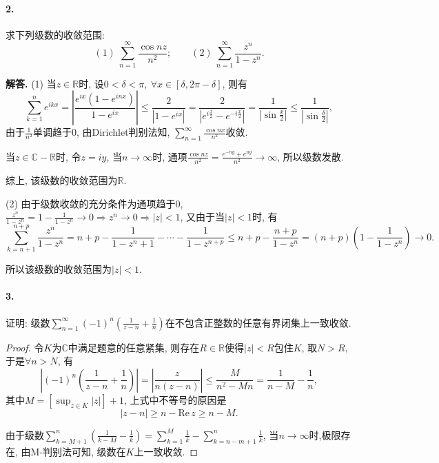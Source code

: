 \documentclass[12pt, a4paper, oneside]{ctexart}
\newenvironment{solution}{\par\noindent\textbf{解答. }}{\bigskip\par}
\let\geq=\geqslant %
\def\R{\mathbb{R}}      %
\def\C{\mathbb{C}}      %
\def\re{\mathrm{Re}\,}    %
\def\add{\vspace{1ex}}  %
\begin{document}
\paragraph{2.}求下列级数的收敛范围:
\begin{equation*}
    (1)\ \sum_{n=1}^\infty\frac{\cos nz}{n^2};\qquad(2)\ \sum_{n=1}^\infty\frac{z^n}{1-z^n}.
\end{equation*}
\begin{solution}
    (1) 当$z\in \mathbb{R}$时, 设$0 < \delta < \pi,\ \forall x \in [\delta, 2\pi - \delta]$, 则有
    \begin{equation*}
        \sum_{k=1}^ne^{ikx} = \left|\frac{e^{ix}(1-e^{inx})}{1-e^{ix}}\right| \leqslant \frac{2}{|1-e^{ix}|} = \frac{2}{|e^{i\frac{x}{2}}-e^{-i\frac{x}{2}}|} = \frac{1}{|\sin\frac{x}{2}|}\leqslant \frac{1}{|\sin\frac{\delta}{2}|},
    \end{equation*}
    由于$\frac{1}{n^2}$单调趋于$0$, 由Dirichlet判别法知, $ \sum_{n=1}^\infty\frac{\cos nx}{n^2}$收敛.

    当$z\in \C-\R$时, 令$z = iy$, 当$n\rightarrow \infty$时, 通项$ \frac{\cos nz}{n^2}=\frac{e^{-ny}+e^{ny}}{n^2}\rightarrow \infty$, 所以级数发散.

    综上, 该级数的收敛范围为$\R$.

    (2) 由于级数收敛的充分条件为通项趋于$0$, $ \frac{z^n}{1-z^n} = 1-\frac{1}{1-z^n} \rightarrow 0\Rightarrow z^n\rightarrow 0\Rightarrow |z| < 1$, 又由于当$|z|<1$时, 有
    \begin{equation*}
        \sum_{k=n+1}^{n+p}\frac{z^n}{1-z^n} = n+p-\frac{1}{1-z^n+1}-\cdots-\frac{1}{1-z^{n+p}}\leqslant n+p-\frac{n+p}{1-z^n} = (n+p)(1-\frac{1}{1-z^n})\rightarrow 0.
    \end{equation*}

    所以该级数的收敛范围为$|z|<1$.
\end{solution}
\paragraph{3.}证明: 级数$ \sum_{n=1}^\infty(-1)^n\left(\frac{1}{z-n}+\frac{1}{n}\right)$在不包含正整数的任意有界闭集上一致收敛.
\begin{proof}
    令$K$为$\C$中满足题意的任意紧集, 则存在$R\in\R$使得$|z|<R$包住$K$, 取$N > R$, 于是$\forall n > N$, 有
    \begin{equation*}
        \left|(-1)^n\left(\frac{1}{z-n}+\frac{1}{n}\right)\right| = \left|\frac{z}{n(z-n)}\right|\leqslant \frac{M}{n^2-Mn}=\frac{1}{n-M}-\frac{1}{n},
    \end{equation*}
    其中$ M = \left[\sup_{z\in K}|z|\right]+1$, 上式中不等号的原因是
    \begin{equation*}
        |z-n|\geq n-\re z\geq n-M.   
    \end{equation*}
    
    由于级数$\sum_{k=M+1}^n\left(\frac{1}{k-M}-\frac{1}{k}\right) = \sum_{k=1}^M\frac{1}{k}-\sum_{k=n-m+1}^n\frac{1}{k}$, 当$n\rightarrow \infty$时,\add 极限存在, 由M-判别法可知, 级数在$K$上一致收敛.
\end{proof}
\end{document}
